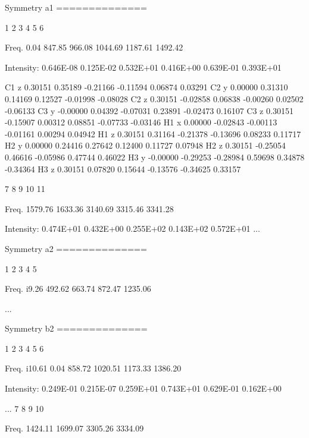 \begin{sourcelisting}
   Symmetry a1
   ==============

                1         2         3         4         5         6

     Freq.       0.04    847.85    966.08   1044.69   1187.61   1492.42

     Intensity:   0.646E-08 0.125E-02 0.532E+01 0.416E+00 0.639E-01 0.393E+01

     C1         z    0.30151   0.35189  -0.21166  -0.11594   0.06874   0.03291
     C2         y    0.00000   0.31310   0.14169   0.12527  -0.01998  -0.08028
     C2         z    0.30151  -0.02858   0.06838  -0.00260   0.02502  -0.06133
     C3         y   -0.00000   0.04392  -0.07031   0.23891  -0.02473   0.16107
     C3         z    0.30151  -0.15907   0.00312   0.08851  -0.07733  -0.03146
     H1         x    0.00000  -0.02843  -0.00113  -0.01161   0.00294   0.04942
     H1         z    0.30151   0.31164  -0.21378  -0.13696   0.08233   0.11717
     H2         y    0.00000   0.24416   0.27642   0.12400   0.11727   0.07948
     H2         z    0.30151  -0.25054   0.46616  -0.05986   0.47744   0.46022
     H3         y   -0.00000  -0.29253  -0.28984   0.59698   0.34878  -0.34364
     H3         z    0.30151   0.07820   0.15644  -0.13576  -0.34625   0.33157


                7         8         9        10        11

     Freq.    1579.76   1633.36   3140.69   3315.46   3341.28

     Intensity:   0.474E+01 0.432E+00 0.255E+02 0.143E+02 0.572E+01
...

    Symmetry a2
   ==============

                         1         2         3         4         5

            Freq.      i9.26    492.62    663.74    872.47   1235.06

...

    Symmetry b2
   ==============

                    1         2         3         4         5         6

        Freq.     i10.61    0.04      858.72   1020.51   1173.33   1386.20

     Intensity:   0.249E-01 0.215E-07 0.259E+01 0.743E+01 0.629E-01 0.162E+00

...
                         7         8         9        10

             Freq.    1424.11   1699.07   3305.26   3334.09


\end{sourcelisting}
